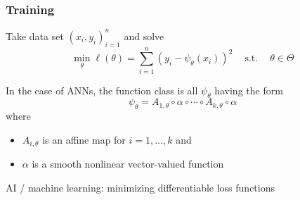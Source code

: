\documentclass[
    xcolor={svgnames,dvipsnames},
    hyperref={colorlinks, citecolor=DeepPink4, linkcolor=DarkRed, urlcolor=DarkBlue}
    ]{beamer}  %
\newcommand{\st}{\ensuremath{\ \mathrm{s.t.}\ }}
\newcommand{\1}{\mathbbm 1}
\begin{document}
\begin{frame}
    \frametitle{Training}

    Take data set $(x_i, y_i)_{i=1}^n$ and solve
    \begin{equation*}
        \min_\theta  \ell(\theta) = \sum_{i=1}^n (y_i - \psi_\theta(x_i))^2
        \quad \st \quad \theta \in \Theta
    \end{equation*}

    In the case of ANNs, the function class is all $\psi_\theta$ having the form
    \begin{equation*}
        \psi_\theta
        = A_{1, \theta} \circ \alpha \circ \cdots \circ A_{k, \theta} \circ \alpha
    \end{equation*}
    where
    \begin{itemize}
        \item $A_{i, \theta}$ is an affine map for $i=1,\ldots,k$ and
        \item $\alpha$ is a smooth nonlinear vector-valued function
    \end{itemize}

\end{frame}


\begin{frame}
    

    AI / machine learning: minimizing differentiable loss functions
    
    \begin{figure}
       \begin{center}
       \end{center}
    \end{figure}


\end{frame}
\end{document}
